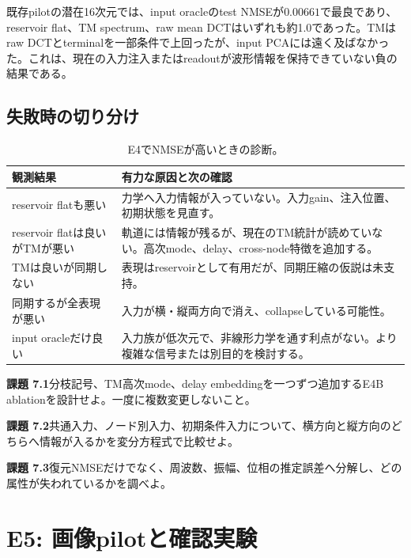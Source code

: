 \documentclass[a4paper,11pt,oneside,openany]{ltjsbook}
\begin{document}
\begin{reportbox}
既存pilotの潜在16次元では、input oracleのtest NMSEが\(0.00661\)で最良であり、reservoir flat、TM spectrum、raw mean DCTはいずれも約1.0であった。TMはraw DCTとterminalを一部条件で上回ったが、input PCAには遠く及ばなかった。これは、現在の入力注入またはreadoutが波形情報を保持できていない負の結果である。
\end{reportbox}

\section{失敗時の切り分け}

\begin{table}[htbp]
\centering
\caption{E4でNMSEが高いときの診断。}
\label{tab:e4_failure_diagnosis}
\begin{tabularx}{\textwidth}{p{42mm}X}
\toprule
観測結果 & 有力な原因と次の確認 \\
\midrule
reservoir flatも悪い & 力学へ入力情報が入っていない。入力gain、注入位置、初期状態を見直す。\\
reservoir flatは良いがTMが悪い & 軌道には情報が残るが、現在のTM統計が読めていない。高次mode、delay、cross-node特徴を追加する。\\
TMは良いが同期しない & 表現はreservoirとして有用だが、同期圧縮の仮説は未支持。\\
同期するが全表現が悪い & 入力が横・縦両方向で消え、collapseしている可能性。\\
input oracleだけ良い & 入力族が低次元で、非線形力学を通す利点がない。より複雑な信号または別目的を検討する。\\
\bottomrule
\end{tabularx}
\end{table}

\begin{taskbox}
\textbf{課題 7.1}\quad 分枝記号、TM高次mode、delay embeddingを一つずつ追加するE4B ablationを設計せよ。一度に複数変更しないこと。

\medskip
\textbf{課題 7.2}\quad 共通入力、ノード別入力、初期条件入力について、横方向と縦方向のどちらへ情報が入るかを変分方程式で比較せよ。

\medskip
\textbf{課題 7.3}\quad 復元NMSEだけでなく、周波数、振幅、位相の推定誤差へ分解し、どの属性が失われているかを調べよ。
\end{taskbox}

\chapter{E5: 画像pilotと確認実験}
\label{chap:e5}
\end{document}
